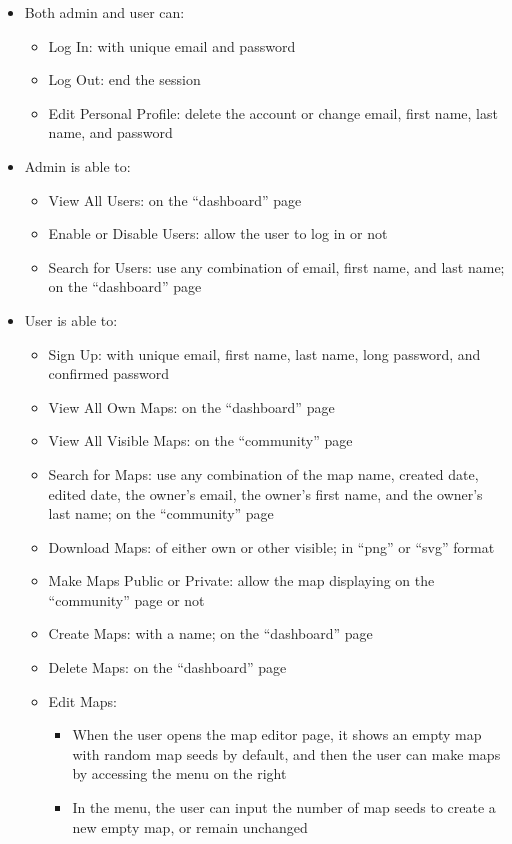\begin{itemize}
  \item Both admin and user can:
  \begin{itemize}
    \item Log In: with unique email and password
    \item Log Out: end the session
    \item Edit Personal Profile: delete the account or change email, first name, last name, and password
  \end{itemize}
  \item Admin is able to:
  \begin{itemize}
    \item View All Users: on the ``dashboard'' page
    \item Enable or Disable Users: allow the user to log in or not
    \item Search for Users: use any combination of email, first name, and last name; on the ``dashboard'' page
  \end{itemize}
  \item User is able to:
  \begin{itemize}
    \item Sign Up: with unique email, first name, last name, long password, and confirmed password
    \item View All Own Maps: on the ``dashboard'' page
    \item View All Visible Maps: on the ``community'' page
    \item Search for Maps: use any combination of the map name, created date, edited date, the owner's email, the owner's first name, and the owner's last name; on the ``community'' page
    \item Download Maps: of either own or other visible; in ``png'' or ``svg'' format
    \item Make Maps Public or Private: allow the map displaying on the ``community'' page or not
    \item Create Maps: with a name; on the ``dashboard'' page
    \item Delete Maps: on the ``dashboard'' page
    \item Edit Maps:
    \begin{itemize}
      \item When the user opens the map editor page, it shows an empty map with random map seeds by default, and then the user can make maps by accessing the menu on the right
    	\item In the menu, the user can input the number of map seeds to create a new empty map, or remain unchanged

\end{itemize}
\end{itemize}
\end{itemize}
